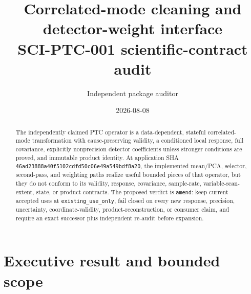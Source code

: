 \documentclass[11pt]{article}
\title{Correlated-mode cleaning and detector-weight interface\\
\large SCI-PTC-001 scientific-contract audit}
\author{Independent package auditor}
\date{2026-08-08}
\newcommand{\code}[1]{\nolinkurl{#1}}
\begin{document}
\maketitle

\begin{abstract}
The independently claimed PTC operator is a data-dependent, stateful
correlated-mode transformation with cause-preserving validity, a conditioned
local response, full covariance, explicitly nonprecision detector
coefficients unless stronger conditions are proved, and immutable product
identity.  At application SHA
\code{46ad23888a40f5102cdfd50c06e49a549bdf8a20}, the implemented mean/PCA,
selector, second-pass, and weighting paths realize useful bounded pieces of
that operator, but they do not conform to its validity, response, covariance,
sample-rate, variable-scan-extent, state, or product contracts.  The proposed
verdict is \texttt{amend}: keep current accepted uses at
\texttt{existing\_use\_only}, fail closed on every new response, precision,
uncertainty, coordinate-validity, product-reconstruction, or consumer claim,
and require an exact successor plus independent re-audit before expansion.
\end{abstract}

\section{Executive result and bounded scope}
\end{document}
